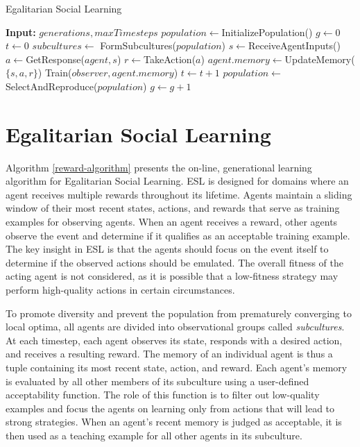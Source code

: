 \documentclass{sig-alternate}
\begin{document}
\begin{algorithm}
\caption{Egalitarian Social Learning}
\label{reward-algorithm}
\begin{algorithmic}
\STATE \textbf{Input:} $generations, maxTimesteps$
\STATE $population \leftarrow$InitializePopulation()
\STATE $g \leftarrow 0$
\STATE $t \leftarrow 0$
\LOOP
{}
  \STATE $subcultures \leftarrow$ FormSubcultures($population$)
        \STATE $s \leftarrow $ReceiveAgentInputs()
        \STATE $a \leftarrow $GetResponse($agent, s$)
        \STATE $r \leftarrow $TakeAction($a$)
        \STATE $agent.memory \leftarrow $UpdateMemory($\{s, a, r\}$)
      \ENDFOR
          \STATE Train($observer, agent.memory$)
        \ENDFOR
      \ENDIF
    \ENDFOR
    \ENDFOR
    \STATE $t \leftarrow t + 1$
  \ENDWHILE
  \STATE $population \leftarrow$SelectAndReproduce($population$)
  \STATE $g \leftarrow g + 1$
\ENDWHILE
\ENDLOOP
\end{algorithmic}
\end{algorithm}

\section{Egalitarian Social Learning}
\label{sec:rbsl}

Algorithm \ref{reward-algorithm} presents the on-line, generational learning algorithm for Egalitarian Social Learning. ESL is designed for domains where an agent receives multiple rewards throughout its lifetime. Agents maintain a sliding window of their most recent states, actions, and rewards that serve as training examples for observing agents. When an agent receives a reward, other agents observe the event and determine if it qualifies as an acceptable training example. The key insight in ESL is that the agents should focus on the event itself to determine if the observed actions should be emulated. The overall fitness of the acting agent is not considered, as it is possible that a low-fitness strategy may perform high-quality actions in certain circumstances.

To promote diversity and prevent the population from prematurely converging to local optima, all agents are divided into observational groups called \textit{subcultures}. At each timestep, each agent observes its state, responds with a desired action, and receives a resulting reward. The memory of an individual agent is thus a tuple containing its most recent state, action, and reward. Each agent's memory is evaluated by all other members of its subculture using a user-defined acceptability function. The role of this function is to filter out low-quality examples and focus the agents on learning only from actions that will lead to strong strategies. When an agent's recent memory is judged as acceptable, it is then used as a teaching example for all other agents in its subculture.
\end{document}
